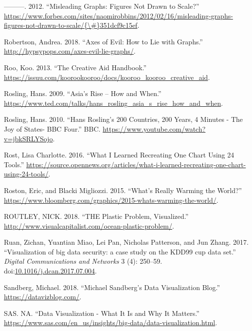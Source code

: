 \documentclass[]{book}
\theoremstyle{definition}
\theoremstyle{definition}
\theoremstyle{definition}
\theoremstyle{remark}
\begin{document}
\hypertarget{ref-scaling_issues}{}
---------. 2012. ``Misleading Graphs: Figures Not Drawn to Scale?''
\href{https://www.forbes.com/sites/naomirobbins/2012/02/16/misleading-graphs-figures-not-drawn-to-scale/\%7B/\#\%7D351dcf9c15ef}{https://www.forbes.com/sites/naomirobbins/2012/02/16/misleading-graphs-figures-not-drawn-to-scale/\{\textbackslash{}\#\}351dcf9c15ef}.

\hypertarget{ref-evil_axes}{}
Robertson, Andrea. 2018. ``Axes of Evil: How to Lie with Graphs.''
\url{http://hypsypops.com/axes-evil-lie-graphs/}.

\hypertarget{ref-creative_aid_handbook}{}
Roo, Koo. 2013. ``The Creative Aid Handbook.''
\url{https://issuu.com/koorookooroo/docs/kooroo_kooroo_creative_aid}.

\hypertarget{ref-hans}{}
Rosling, Hans. 2009. ``Asia's Rise -- How and When.''
\url{https://www.ted.com/talks/hans_rosling_asia_s_rise_how_and_when}.

\hypertarget{ref-hans_rosling}{}
Rosling, Hans. 2010. ``Hans Rosling's 200 Countries, 200 Years, 4
Minutes - The Joy of States- BBC Four.'' BBC.
\url{https://www.youtube.com/watch?v=jbkSRLYSojo}.

\hypertarget{ref-different_tools}{}
Rost, Lisa Charlotte. 2016. ``What I Learned Recreating One Chart Using
24 Tools.''
\url{https://source.opennews.org/articles/what-i-learned-recreating-one-chart-using-24-tools/}.

\hypertarget{ref-world_warming}{}
Roston, Eric, and Blacki Migliozzi. 2015. ``What's Really Warming the
World?''
\url{https://www.bloomberg.com/graphics/2015-whats-warming-the-world/}.

\hypertarget{ref-plastic_pollution_infographics}{}
ROUTLEY, NICK. 2018. ``THE Plastic Problem, Visualized.''
\url{http://www.visualcapitalist.com/ocean-plastic-problem/}.

\hypertarget{ref-gapminder}{}
Ruan, Zichan, Yuantian Miao, Lei Pan, Nicholas Patterson, and Jun Zhang.
2017. ``Visualization of big data security: a case study on the KDD99
cup data set.'' \emph{Digital Communications and Networks} 3 (4):
250--59.
doi:\href{https://doi.org/10.1016/j.dcan.2017.07.004}{10.1016/j.dcan.2017.07.004}.

\hypertarget{ref-sandberg_blog}{}
Sandberg, Michael. 2018. ``Michael Sandberg's Data Visualization Blog.''
\url{https://datavizblog.com/}.

\hypertarget{ref-why_dataviz_matters}{}
SAS. NA. ``Data Visualization - What It Is and Why It Matters.''
\url{https://www.sas.com/en_us/insights/big-data/data-visualization.html}.
\end{document}
